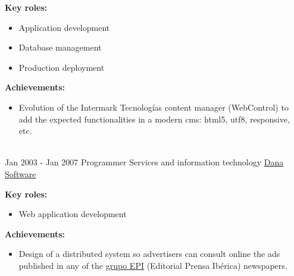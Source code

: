\documentclass[letterpaper]{twentysecondcv} %
\begin{document}
\begin{twenty}
{    \textbf{Key roles:}
    \begin{itemize}
    \item Application development
    \item Database management
    \item Production deployment
    \end{itemize}

    \textbf{Achievements:}
    \begin{itemize}
    \item Evolution of the Intermark Tecnologías content manager (WebControl)
      to add the expected functionalities in a modern cms: html5, utf8,
      responsive, etc.
    \end{itemize}
  }
  \\
  \twentyitem
  {Jan 2003 -}
  {Jan 2007}
  {Programmer}
  {Services and information technology}
  {\href{http://www.danasoftware.com/}{Dana Software}}
  {

    \textbf{Key roles:}
    \begin{itemize}
    \item Web application development
    \end{itemize}

    \textbf{Achievements:}
    \begin{itemize}
    \item Design of a distributed system so advertisers can consult online the
      ads published in any of the \href{http://www.epi.es/}{grupo EPI}
      (Editorial Prensa Ibérica) newspapers.
    \end{itemize}
  }

\end{twenty}
\end{document}
